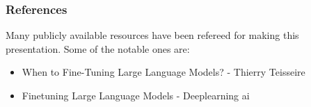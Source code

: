 \begin{frame}\frametitle{References}
Many publicly available resources have been refereed for making this presentation. Some of the notable ones are:
\footnotesize
\begin{itemize}
\item When to Fine-Tuning Large Language Models? - Thierry Teisseire
\item Finetuning Large Language Models - Deeplearning ai
\end{itemize}

\end{frame}
